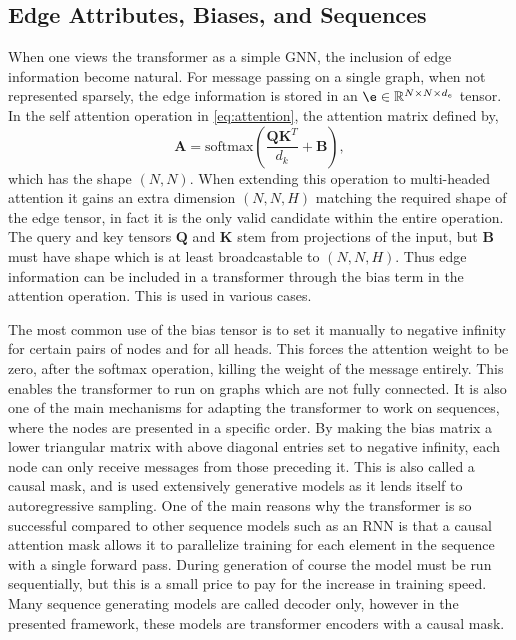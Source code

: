 \subsection{Edge Attributes, Biases, and Sequences}

When one views the transformer as a simple GNN, the inclusion of edge information become natural.
For message passing on a single graph, when not represented sparsely, the edge information is stored in an $\e \in \mathbb{R}^{N \times N \times d_e}$ tensor.
In the self attention operation in \cref{eq:attention}, the attention matrix defined by,
\begin{equation}
    \mathbf{A} = \text{softmax}\left( \frac{\mathbf{Q} \mathbf{K}^T}{d_k} + \mathbf{B} \right),
\end{equation}
which has the shape $(N, N)$.
When extending this operation to multi-headed attention it gains an extra dimension $(N, N, H)$ matching the required shape of the edge tensor, in fact it is the only valid candidate within the entire operation.
The query and key tensors $\mathbf{Q}$ and $\mathbf{K}$ stem from projections of the input, but $\mathbf{B}$ must have shape which is at least broadcastable to $(N, N, H)$.
Thus edge information can be included in a transformer through the bias term in the attention operation.
This is used in various cases.

The most common use of the bias tensor is to set it manually to negative infinity for certain pairs of nodes and for all heads.
This forces the attention weight to be zero, after the softmax operation, killing the weight of the message entirely.
This enables the transformer to run on graphs which are not fully connected.
It is also one of the main mechanisms for adapting the transformer to work on sequences, where the nodes are presented in a specific order.
By making the bias matrix a lower triangular matrix with above diagonal entries set to negative infinity, each node can only receive messages from those preceding it.
This is also called a causal mask, and is used extensively generative models as it lends itself to autoregressive sampling.
One of the main reasons why the transformer is so successful compared to other sequence models such as an RNN is that a causal attention mask allows it to parallelize training for each element in the sequence with a single forward pass.
During generation of course the model must be run sequentially, but this is a small price to pay for the increase in training speed.
Many sequence generating models are called decoder only, however in the presented framework, these models are transformer encoders with a causal mask.

